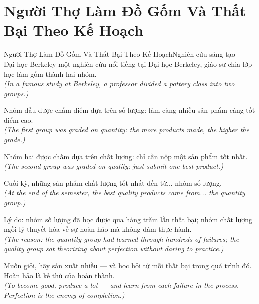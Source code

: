 \section{Người Thợ Làm Đồ Gốm Và Thất Bại Theo Kế Hoạch}
\begin{truyen}{Người Thợ Làm Đồ Gốm Và Thất Bại Theo Kế Hoạch}{Nghiên cứu sáng tạo --- Đại học Berkeley}
 một nghiên cứu nổi tiếng tại Đại học Berkeley, giáo sư chia lớp học làm gốm thành hai nhóm.\\[4pt]
\textit{(In a famous study at Berkeley, a professor divided a pottery class into two groups.)}

Nhóm đầu được chấm điểm dựa trên số lượng: làm càng nhiều sản phẩm càng tốt điểm cao.\\[4pt]
\textit{(The first group was graded on quantity: the more products made, the higher the grade.)}

Nhóm hai được chấm dựa trên chất lượng: chỉ cần nộp một sản phẩm tốt nhất.\\[4pt]
\textit{(The second group was graded on quality: just submit one best product.)}

Cuối kỳ, những sản phẩm chất lượng tốt nhất đến từ... nhóm số lượng.\\[4pt]
\textit{(At the end of the semester, the best quality products came from... the quantity group.)}

Lý do: nhóm số lượng đã học được qua hàng trăm lần thất bại; nhóm chất lượng ngồi lý thuyết hóa về sự hoàn hảo mà không dám thực hành.\\[4pt]
\textit{(The reason: the quantity group had learned through hundreds of failures; the quality group sat theorizing about perfection without daring to practice.)}

\end{truyen}
\begin{baihoc}
  Muốn giỏi, hãy sản xuất nhiều --- và học hỏi từ mỗi thất bại trong quá trình đó. Hoàn hảo là kẻ thù của hoàn thành.\\[4pt]
  \textit{(To become good, produce a lot --- and learn from each failure in the process. Perfection is the enemy of completion.)}
\end{baihoc}

